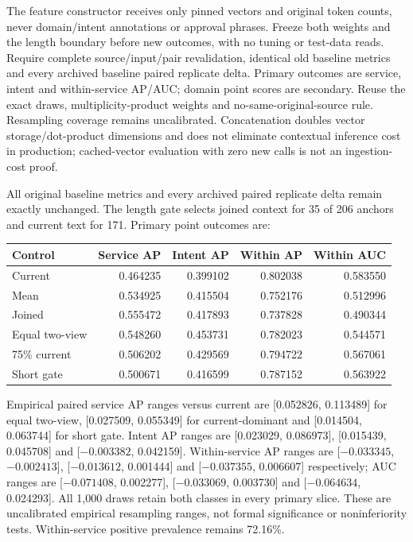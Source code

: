 \documentclass[11pt]{article}
\begin{document}
The feature constructor receives only pinned vectors and original token counts,
never domain/intent annotations or approval phrases. Freeze both weights and the
length boundary before new outcomes, with no tuning or test-data reads. Require
complete source/input/pair revalidation, identical old baseline metrics and every
archived baseline paired replicate delta. Primary outcomes are service, intent
and within-service AP/AUC; domain point scores are secondary. Reuse the exact
draws, multiplicity-product weights and no-same-original-source rule. Resampling
coverage remains uncalibrated. Concatenation doubles vector storage/dot-product
dimensions and does not eliminate contextual inference cost in production;
cached-vector evaluation with zero new calls is not an ingestion-cost proof.

All original baseline metrics and every archived paired replicate delta remain
exactly unchanged. The length gate selects joined context for 35 of 206 anchors
and current text for 171. Primary point outcomes are:
\begin{center}
\begin{tabular}{lrrrr}
\toprule
Control & Service AP & Intent AP & Within AP & Within AUC \\
\midrule
Current & 0.464235 & 0.399102 & 0.802038 & 0.583550 \\
Mean & 0.534925 & 0.415504 & 0.752176 & 0.512996 \\
Joined & 0.555472 & 0.417893 & 0.737828 & 0.490344 \\
Equal two-view & 0.548260 & 0.453731 & 0.782023 & 0.544571 \\
75\% current & 0.506202 & 0.429569 & 0.794722 & 0.567061 \\
Short gate & 0.500671 & 0.416599 & 0.787152 & 0.563922 \\
\bottomrule
\end{tabular}
\end{center}
Empirical paired service AP ranges versus current are [0.052826, 0.113489] for
equal two-view, [0.027509, 0.055349] for current-dominant and [0.014504, 0.063744]
for short gate. Intent AP ranges are [0.023029, 0.086973], [0.015439, 0.045708]
and [$-0.003382$, 0.042159]. Within-service AP ranges are
[$-0.033345$, $-0.002413$], [$-0.013612$, 0.001444] and
[$-0.037355$, 0.006607] respectively; AUC ranges are
[$-0.071408$, 0.002277], [$-0.033069$, 0.003730] and
[$-0.064634$, 0.024293]. All 1,000 draws retain both classes in every primary slice.
These are uncalibrated empirical resampling ranges, not formal significance or
noninferiority tests. Within-service positive prevalence remains 72.16\%.
\end{document}
